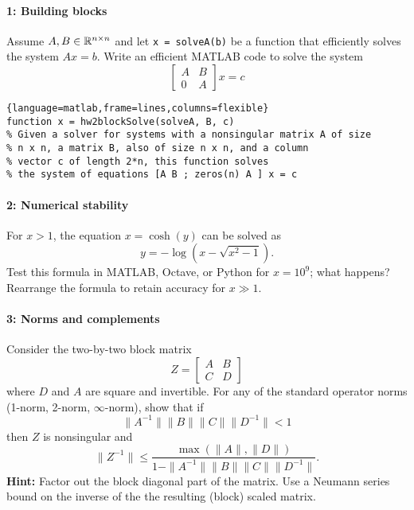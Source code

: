 \documentclass[12pt, leqno]{article}
\begin{document}

\paragraph{1: Building blocks}
Assume $A, B \in \mathbb{R}^{n \times n}$ and let {\tt x = solveA(b)} be a function
that efficiently solves the system $Ax = b$.
Write an efficient MATLAB code to solve the system
\[
  \begin{bmatrix} A & B \\ 0 & A \end{bmatrix} x = c
\]

\begin{lstlisting}{language=matlab,frame=lines,columns=flexible}
function x = hw2blockSolve(solveA, B, c)
% Given a solver for systems with a nonsingular matrix A of size
% n x n, a matrix B, also of size n x n, and a column
% vector c of length 2*n, this function solves 
% the system of equations [A B ; zeros(n) A ] x = c
\end{lstlisting}

\paragraph*{2: Numerical stability}
For $x > 1$, the equation $x = \cosh(y)$ can be solved as
\[
  y = -\log\left( x-\sqrt{x^2-1} \right).
\]
Test this formula in MATLAB, Octave, or Python for $x = 10^9$; what
happens?  Rearrange the formula to retain accuracy for $x \gg 1$.

\paragraph*{3: Norms and complements}
Consider the two-by-two block matrix
\[
Z = \begin{bmatrix} A & B \\ C & D \end{bmatrix}
\]
where $D$ and $A$ are square and invertible.  For any of the standard
operator norms (1-norm, 2-norm, $\infty$-norm), show that if
\[
  \|A^{-1}\| \|B\| \|C\| \|D^{-1}\| < 1
\]
then $Z$ is nonsingular and
\[
  \|Z^{-1}\| \leq \frac{\max(\|A\|, \|D\|)}{1-\|A^{-1}\|\|B\|\|C\|\|D^{-1}\|}.
\]
{\bf Hint:} Factor out the block diagonal part of the matrix.
Use a Neumann series bound on the inverse of the
the resulting (block) scaled matrix.
\end{document}
